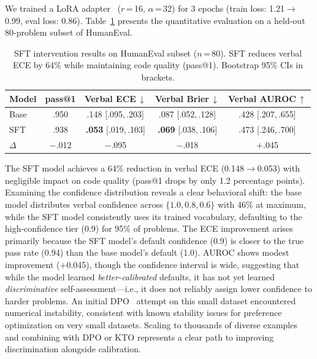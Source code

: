 \documentclass{article}
\begin{document}
We trained a LoRA adapter~\citep{hu2022lora} ($r$\,=\,16, $\alpha$\,=\,32) for 3 epochs (train loss: 1.21$\rightarrow$0.99, eval loss: 0.86). Table~\ref{tab:sft} presents the quantitative evaluation on a held-out 80-problem subset of HumanEval.

\begin{table}[t]
\centering
\caption{SFT intervention results on HumanEval subset ($n$\,=\,80). SFT reduces verbal ECE by 64\% while maintaining code quality (pass@1). Bootstrap 95\% CIs in brackets.}
\label{tab:sft}
\small
\setlength{\tabcolsep}{3pt}
\begin{tabular}{@{}lcccc@{}}
\toprule
\textbf{Model} & \textbf{pass@1} & \textbf{Verbal ECE\,$\downarrow$} & \textbf{Verbal Brier\,$\downarrow$} & \textbf{Verbal AUROC\,$\uparrow$} \\
\midrule
Base  & .950 & .148 {\scriptsize[.095,\,.203]} & .087 {\scriptsize[.052,\,.128]} & .428 {\scriptsize[.207,\,.655]} \\
SFT   & .938 & \textbf{.053} {\scriptsize[.019,\,.103]} & \textbf{.069} {\scriptsize[.038,\,.106]} & .473 {\scriptsize[.246,\,.700]} \\
\midrule
$\Delta$ & $-$.012 & $-$.095 & $-$.018 & $+$.045 \\
\bottomrule
\end{tabular}
\vspace{-0.5em}
\end{table}

The SFT model achieves a 64\% reduction in verbal ECE (0.148$\rightarrow$0.053) with negligible impact on code quality (pass@1 drops by only 1.2 percentage points). Examining the confidence distribution reveals a clear behavioral shift: the base model distributes verbal confidence across $\{1.0, 0.8, 0.6\}$ with 46\% at maximum, while the SFT model consistently uses its trained vocabulary, defaulting to the high-confidence tier (0.9) for 95\% of problems. The ECE improvement arises primarily because the SFT model's default confidence (0.9) is closer to the true pass rate (0.94) than the base model's default (1.0). AUROC shows modest improvement ($+$0.045), though the confidence interval is wide, suggesting that while the model learned \emph{better-calibrated} defaults, it has not yet learned \emph{discriminative} self-assessment---i.e., it does not reliably assign lower confidence to harder problems. An initial DPO~\citep{rafailov2023direct} attempt on this small dataset encountered numerical instability, consistent with known stability issues for preference optimization on very small datasets. Scaling to thousands of diverse examples and combining with DPO or KTO represents a clear path to improving discrimination alongside calibration.
\end{document}
